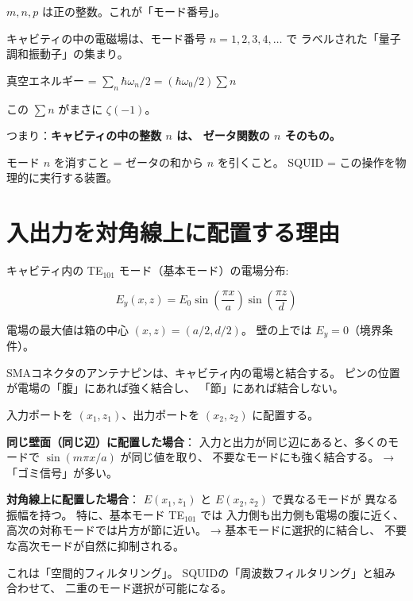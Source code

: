 \documentclass[12pt,a4paper]{article}
\begin{document}
$m, n, p$ は正の整数。これが「モード番号」。

\begin{theorybox}[整数とζ関数の直接的なつながり]
キャビティの中の電磁場は、モード番号 $n = 1, 2, 3, 4, \ldots$ で
ラベルされた「量子調和振動子」の集まり。

真空エネルギー = $\sum_n \hbar\omega_n/2 = (\hbar\omega_0/2) \sum n$

この $\sum n$ がまさに $\zeta(-1)$。

つまり：\textbf{キャビティの中の整数 $n$ は、
ゼータ関数の $n$ そのもの。}

モード $n$ を消すこと = ゼータの和から $n$ を引くこと。
SQUID = この操作を物理的に実行する装置。
\end{theorybox}

\section{入出力を対角線上に配置する理由}

\begin{theorybox}[波の干渉とモード選択]
キャビティ内の TE$_{101}$ モード（基本モード）の電場分布:

$$E_y(x, z) = E_0 \sin\left(\frac{\pi x}{a}\right) \sin\left(\frac{\pi z}{d}\right)$$

電場の最大値は箱の中心 $(x, z) = (a/2, d/2)$。
壁の上では $E_y = 0$（境界条件）。

SMAコネクタのアンテナピンは、キャビティ内の電場と結合する。
ピンの位置が電場の「腹」にあれば強く結合し、
「節」にあれば結合しない。
\end{theorybox}

\begin{insightbox}[なぜ対角線か]
入力ポートを $(x_1, z_1)$、出力ポートを $(x_2, z_2)$ に配置する。

\textbf{同じ壁面（同じ辺）に配置した場合}：
入力と出力が同じ辺にあると、多くのモードで
$\sin(m\pi x/a)$ が同じ値を取り、
不要なモードにも強く結合する。
→ 「ゴミ信号」が多い。

\textbf{対角線上に配置した場合}：
$E(x_1, z_1)$ と $E(x_2, z_2)$ で異なるモードが
異なる振幅を持つ。
特に、基本モード TE$_{101}$ では
入力側も出力側も電場の腹に近く、
高次の対称モードでは片方が節に近い。
→ 基本モードに選択的に結合し、
不要な高次モードが自然に抑制される。

これは「空間的フィルタリング」。
SQUIDの「周波数フィルタリング」と組み合わせて、
二重のモード選択が可能になる。
\end{insightbox}
\end{document}
